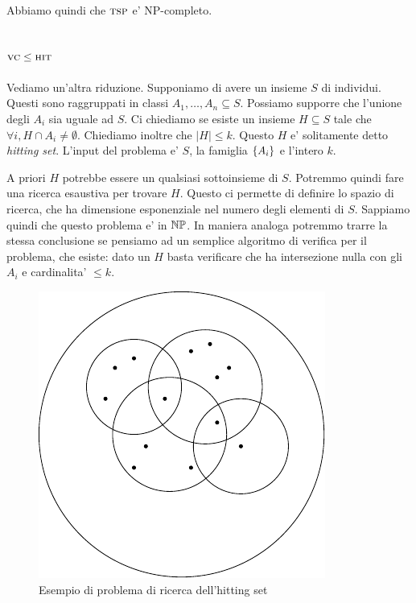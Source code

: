 
Abbiamo quindi che $\textsc{tsp}$ e' NP-completo.

\subsection{$\textsc{vc} \leq \textsc{hit}$}

Vediamo un'altra riduzione. Supponiamo di avere un insieme $S$ di individui. Questi sono raggruppati
in classi $A_{1},\dotsc,A_{n} \subseteq S$. Possiamo supporre che l'unione degli $A_{i}$ sia uguale
ad $S$. Ci chiediamo se esiste un insieme $H \subseteq S$ tale che $\forall i, H \cap A_{i} \not=
\emptyset$. Chiediamo inoltre che $|H| \leq k$. Questo $H$ e' solitamente detto \textit{hitting
set}. L'input del problema e' $S$, la famiglia $\left\{A_{i}\right\}$ e l'intero $k$.

A priori $H$ potrebbe essere un qualsiasi sottoinsieme di $S$. Potremmo quindi fare una ricerca
esaustiva per trovare $H$. Questo ci permette di definire lo spazio di ricerca, che ha dimensione
esponenziale nel numero degli elementi di $S$. Sappiamo quindi che questo problema e' in $\mathbb{NP}$.
In maniera analoga potremmo trarre la stessa conclusione se pensiamo ad un semplice algoritmo di
verifica per il problema, che esiste: dato un $H$ basta verificare che ha intersezione nulla con gli
$A_{i}$ e cardinalita' $\leq k$.

\begin{figure}[h]
    \begin{center}
        \includegraphics{./img/NPClass/HIT.pdf}
        \caption{Esempio di problema di ricerca dell'hitting set}
    \end{center}
\end{figure}

